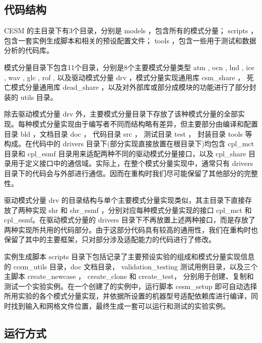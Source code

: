 \subsection{代码结构}

CESM 的主目录下有3个目录，分别是 models ，包含所有的模式分量； scripts ，包含一套实例生成脚本和相关的预设配置文件； tools ，包含一些用于测试和数据分析的代码库。

模式分量目录下包含11个目录，分别是8个主要模式分量类型 atm , ocn , lnd , ice , wav , glc , rof , 以及驱动模式分量 drv ，模式分量实现通用库 csm\_share ， 死亡模式分量通用库 dead\_share ，以及对外部库或部分成模块的功能进行了部分封装的 utils 目录。

除去驱动模式分量 drv 外，主要模式分量目录下存放了该种模式分量的全部实现。每种模式分量实现由于编写者不同而结构略有差异，但主要部分由编译和配置目录 bld ，文档目录 doc ， 代码目录 src ， 测试目录 test ， 封装目录 tools 等构成。在代码中的 drivers 目录下(部分实现直接放置在根目录下)均包含 cpl\_mct 目录和 cpl\_esmf 目录用来适配两种不同的驱动模式分量接口，以及 cpl\_share 目录用于定义接口中的通信域。实际上，在整个模式分量实现中，通常只有  drivers 目录下的代码会与外部进行通信。因而在重构时我们尽可能保留了其他部分的完整性。

驱动模式分量 drv 的目录结构与单个主要模式分量实现类似，其主目录下直接存放了两种实现 shr 和 shr\_esmf ，分别对应每种模式分量实现的接口 cpl\_mct 和 cpl\_esmf。在驱动模式分量的 drivers 目录下不再放置上述两种接口，而是存放了两种实现所共用的代码部分。由于这部分代码具有较高的通用性，我们在重构时也保留了其中的主要框架，只对部分涉及适配能力的代码进行了修改。

实例生成脚本 scripts 目录下包括记录了主要预设实验的组成和模式分量实现信息的 ccsm\_utils 目录，doc 文档目录， validation\_testing 测试用例目录，以及三个主脚本 create\_newcase ， create\_clone 和 create\_test， 分别用于创建、复制和测试一个实验实例。在一个创建了的实例中，运行脚本 cesm\_setup 即可自动选择所用实验的各个模式分量实现，并依据所设置的机器型号适配依赖库进行编译，同时找到输入和网格文件位置，最终生成一套可以运行和测试的实验实例。

\subsection{运行方式}

